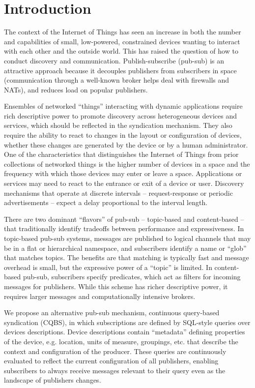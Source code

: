 \section{Introduction}

The context of the Internet of Things has seen an increase in both the number and capabilities of small, low-powered, constrained devices wanting to interact with each other and the outside world.
This has raised the question of how to conduct discovery and communication.
Publish-subscribe (pub-sub) is an attractive approach because it decouples publishers from subscribers in space (communication through a well-known broker helps deal with firewalls and NATs), and reduces load on popular publishers.

Ensembles of networked ``things'' interacting with dynamic applications require rich descriptive power to promote discovery across heterogeneous devices and services, which should be reflected in the syndication mechanism. They also require the ability to react to changes in the layout or configuration of devices, whether these changes are generated by the device or by a human administrator.
One of the characteristics that distinguishes the Internet of Things from prior collections of networked things is the higher number of devices in a space and the frequency with which those devices may enter or leave a space.
Applications or services may need to react to the entrance or exit of a device or user.
Discovery mechanisms that operate at discrete intervals -- request-response or periodic advertisements -- expect a delay proportional to the interval length.

There are two dominant ``flavors'' of pub-sub -- topic-based and content-based -- that traditionally identify tradeoffs between performance and expressiveness.
In topic-based pub-sub systems, messages are published to logical channels that may be in a flat or hierarchical namespace, and subscribers identify a name or ``glob'' that matches topics.
The benefits are that matching is typically fast and message overhead is small, but the expressive power of a ``topic'' is limited.
In content-based pub-sub, subscribers specify predicates, which act as filters for incoming messages for publishers.
While this scheme has richer descriptive power, it requires larger messages and computationally intensive brokers.

We propose an alternative pub-sub mechanism, continuous query-based syndication (CQBS), in which subscriptions are defined by SQL-style queries over devices descriptions.
Device descriptions contain ``metadata'' defining properties of the device, e.g. location, units of measure, groupings, etc. that describe the context and configuration of the producer.
These queries are continuously evaluated to reflect the current configuration of all publishers, enabling subscribers to always receive messages relevant to their query even as the landscape of
publishers changes.

